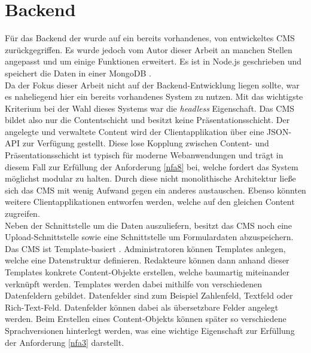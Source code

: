 \section{Backend}
\label{sec:backend}

Für das Backend der \shst{} wurde auf ein bereits vorhandenes, von \meso{} entwickeltes
CMS zurückgegriffen. Es wurde jedoch vom Autor dieser Arbeit
an manchen Stellen angepasst und um einige Funktionen
erweitert. Es ist in Node.js \cite{node} geschrieben und speichert die Daten in einer 
MongoDB \cite{mongo}.\\
Da der Fokus dieser Arbeit nicht auf der Backend-Entwicklung liegen sollte, war es 
naheliegend hier ein bereits vorhandenes System zu nutzen. Mit das wichtigste Kriterium
bei der Wahl dieses Systems war die \emph{headless} Eigenschaft. Das CMS bildet also nur 
die Contentschicht und besitzt keine Präsentationsschicht. Der angelegte und verwaltete
Content wird der Clientapplikation über eine JSON-API zur Verfügung gestellt. 
Diese lose Kopplung zwischen Content- und Präsentationsschicht ist typisch für moderne
Webanwendungen und trägt in diesem Fall zur Erfüllung der Anforderung \ref{nfa8} bei,
welche fordert das System möglichst modular zu halten. Durch diese nicht monolithische 
Architektur ließe sich das CMS mit wenig Aufwand gegen ein anderes austauschen. Ebenso
könnten weitere Clientapplikationen entworfen werden, welche auf den gleichen Content
zugreifen.\\
Neben der Schnittstelle um die Daten auszuliefern, besitzt das CMS noch eine
Upload-Schnittstelle sowie eine Schnittstelle um Formulardaten abzuspeichern.\\

Das CMS ist Template-basiert . Administratoren können Templates 
anlegen, welche eine Datenstruktur definieren. Redakteure können dann anhand dieser Templates 
konkrete Content-Objekte erstellen, welche baumartig miteinander verknüpft werden. Templates 
werden dabei mithilfe von verschiedenen Datenfeldern gebildet. Datenfelder sind zum Beispiel
Zahlenfeld, Textfeld oder Rich-Text-Feld. Datenfelder können dabei als übersetzbare Felder angelegt
werden. Beim Erstellen eines Content-Objekts können später so verschiedene Sprachversionen
hinterlegt werden, was eine wichtige Eigenschaft zur Erfüllung der Anforderung \ref{nfa3}
darstellt.\\



\iffalse
Template-basiert
Admins können Templates mit Datenstruktur erstellen
Redakteure können Objekte anhand von Templates erstellen
Sharing Station gibt Templates für Menü oder Modul
Navigationsstruktur der Oberfläche ist Baumartig - so sind auch die Daten
\fi